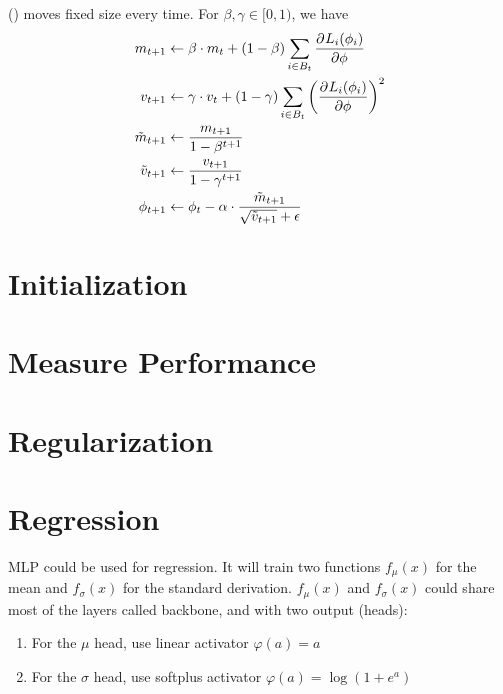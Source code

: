 () moves fixed size every time. For $\beta, \gamma \in [0,1)$, we have
\begin{equation}
    \begin{aligned}
        m_{t+1} &\leftarrow \beta \cdot m_t + (1-\beta) \sum_{i \in B_t} \dpd{L_i (\phi_i)}{\phi} \\
        v_{t+1} &\leftarrow \gamma \cdot v_t + (1-\gamma) \sum_{i \in B_t} \left({\dpd{L_i (\phi_i)}{\phi}}\right)^2 \\
        \tilde{m}_{t+1} &\leftarrow \frac{m_{t+1}}{1- \beta^{t+1}} \\
        \tilde{v}_{t+1} &\leftarrow \frac{v_{t+1}}{1- \gamma^{t+1}} \\
        \phi_{t+1} &\leftarrow \phi_t - \alpha \cdot \frac{\tilde{m}_{t+1}}{\sqrt{\tilde{v}_{t+1}} + \epsilon}
    \end{aligned}
\end{equation}


\section{Initialization}



\section{Measure Performance}

\section{Regularization}


\section{Regression}

MLP could be used for regression. It will train two functions $f_\mu (x)$ for the mean and $f_\sigma (x)$ for the standard derivation. $f_\mu(x)$ and $f_\sigma(x)$ could share most of the layers called backbone, and with two output (heads):
\begin{enumerate}
    \item For the $\mu$ head, use linear activator $\varphi(a) = a$
    \item For the $\sigma$ head, use softplus activator $\varphi(a) = \log(1 + e^a)$
\end{enumerate}


